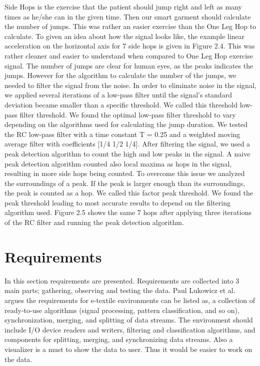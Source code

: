 Side Hops is the exercise that the patient should jump right and left as many times as he/she can in the given time. Then our smart garment should calculate the number of jumps. This was rather an easier exercise than the One Leg Hop to calculate. To given an idea about how the signal looks like, the example linear acceleration on the horizontal axis for 7 side hops is given in Figure 2.4. This was rather cleaner and easier to understand when compared to One Leg Hop exercise signal. The number of jumps are clear for human eyes, as the peaks indicates the jumps. However for the algorithm to calculate the number of the jumps, we needed to filter the signal from the noise. In order to eliminate noise in the signal, we applied several iterations of a low-pass filter until the signal's standard deviation became smaller than a specific threshold. We called this threshold low-pass filter threshold. We found the optimal low-pass filter threshold to vary depending on the algorithms used for calculating the jump duration. We tested the RC low-pass filter with a time constant T = 0.25 and a weighted moving average filter with coefficients [1/4 1/2 1/4]. After filtering the signal, we used a peak detection algorithm to count the high and low peaks in the signal. A naive peak detection algorithm counted also local maxima as hops in the signal, resulting in more side hops being counted. To overcome this issue we analyzed the surroundings of a peak. If the peak is larger enough than its surroundings, the peak is counted as a hop. We called this factor peak threshold. We found the peak threshold leading to most accurate results to depend on the filtering algorithm used. Figure 2.5 shows the same 7 hops after applying three iterations of the RC filter and running the peak detection algorithm.




\section{Requirements}
			
In this section requirements are presented. Requirements are collected into 3 main parts; gathering, observing and testing the data. Paul Lukowicz et al. argues the requirements for e-textile environments can be listed as, a collection of ready-to-use algorithms (signal processing, pattern classification, and so on), synchronization, merging, and splitting of data streams. The environment should include I/O device readers and writers, filtering and classification algorithms, and components for splitting, merging, and synchronizing data streams. Also a visualizer is a must to show the data to user. Thus it would be easier to work on the data. 

